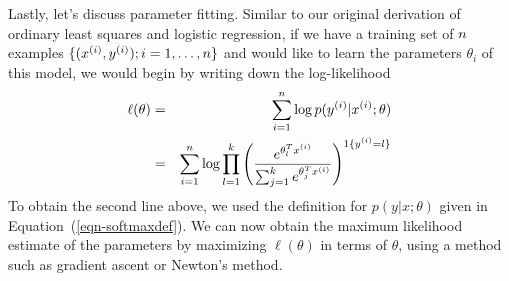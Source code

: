 \documentclass{article}
\begin{document}
Lastly, let's discuss parameter fitting. Similar to our original derivation of ordinary least squares
and logistic regression, if we have a training set of ${n}$ examples $\{({x^{(i)}}, {y^{(i)}}); i=1,\ldots,{n}\}$
and would like to learn the parameters $\theta_i$ of this model, we would begin by writing
down the log-likelihood
\begin{eqnarray*}
\ell(\theta) &=& \sum_{i=1}^{n} \log p({y^{(i)}}|{x^{(i)}};\theta) \\
&=& \sum_{i=1}^{n} \log \prod_{l=1}^k \left(
    \frac{e^{\theta^T_l{x^{(i)}}}}{\sum_{j=1}^k e^{\theta^T_j{x^{(i)}}}} \right)^{1\{{y^{(i)}}=l\}}
\end{eqnarray*}
To obtain the second line above, we used the definition for $p(y|x;\theta)$ given in Equation~(\ref{eqn-softmaxdef}).
We can now obtain the maximum likelihood estimate of the parameters by maximizing $\ell(\theta)$
in terms of $\theta$, using a method such as gradient ascent or Newton's method.




%


\end{document}
